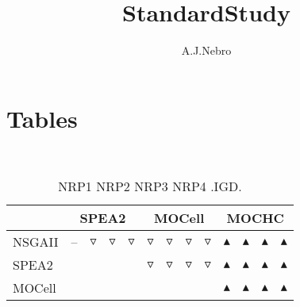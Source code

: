 \documentclass{article}
\title{StandardStudy}
\author{A.J.Nebro}
\begin{document}
\maketitle
\section{Tables}
\
\begin{table}
\caption{
NRP1 NRP2 NRP3 NRP4 
.IGD.}
\label{Table:
NRP1 NRP2 NRP3 NRP4 
.IGD.}
\centering
\begin{scriptsize}
\begin{tabular}{
| l | p{0.15cm }p{0.15cm }p{0.15cm }p{0.15cm } | p{0.15cm }p{0.15cm }p{0.15cm }p{0.15cm } | p{0.15cm }p{0.15cm }p{0.15cm }p{0.15cm } | 
}
\hline \multicolumn{1}{|c|}{} & \multicolumn{4}{c|}{SPEA2} & \multicolumn{4}{c|}{MOCell} & \multicolumn{4}{c|}{MOCHC} \\
\hline 
NSGAII
 & 
--
&
$\triangledown$
&
$\triangledown$
&
$\triangledown$
 & 
$\triangledown$
&
$\triangledown$
&
$\triangledown$
&
$\triangledown$
 & 
$\blacktriangle$
&
$\blacktriangle$
&
$\blacktriangle$
&
$\blacktriangle$
 \\ 
SPEA2
 & 
  
&
  
&
  
&
  
 & 
$\triangledown$
&
$\triangledown$
&
$\triangledown$
&
$\triangledown$
 & 
$\blacktriangle$
&
$\blacktriangle$
&
$\blacktriangle$
&
$\blacktriangle$
 \\ 
MOCell
 & 
 
&
 
&
 
&
 
 & 
  
&
  
&
  
&
  
 & 
$\blacktriangle$
&
$\blacktriangle$
&
$\blacktriangle$
&
$\blacktriangle$
 \\ 
\hline
\end{tabular}
\end{scriptsize}
\end{table}
\end{document}
